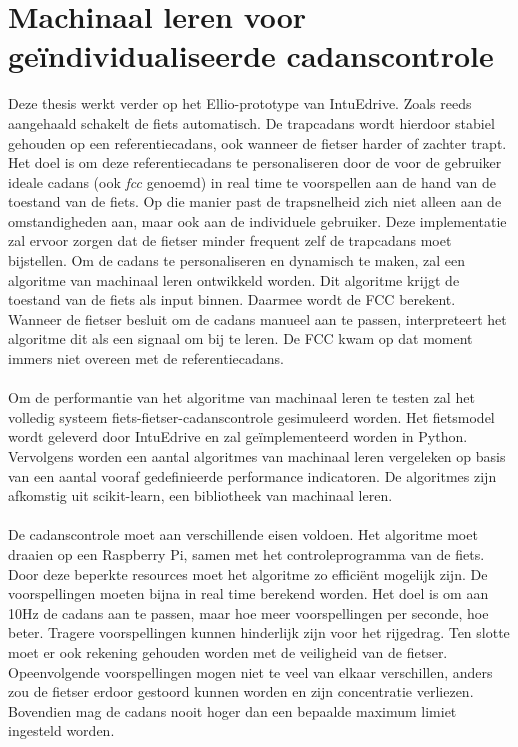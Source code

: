 \section{Machinaal leren voor geïndividualiseerde cadanscontrole}
Deze thesis werkt verder op het Ellio-prototype van IntuEdrive. Zoals reeds aangehaald schakelt de fiets automatisch. De trapcadans wordt hierdoor stabiel gehouden op een referentiecadans, ook wanneer de fietser harder of zachter trapt. Het doel is om deze referentiecadans te personaliseren door de voor de gebruiker ideale cadans (ook \textit{\gls{fcc}} genoemd) in real time te voorspellen aan de hand van de toestand van de fiets. Op die manier past de trapsnelheid zich niet alleen  aan de omstandigheden aan, maar ook aan de individuele gebruiker. Deze implementatie zal ervoor zorgen dat de fietser minder frequent zelf de trapcadans moet bijstellen. Om de cadans te personaliseren en dynamisch te maken, zal een algoritme van machinaal leren ontwikkeld worden. Dit algoritme krijgt de toestand van de fiets als input binnen. Daarmee wordt de FCC berekent. Wanneer de fietser besluit om de cadans manueel aan te passen, interpreteert het algoritme dit als een signaal om bij te leren. De FCC kwam op dat moment immers niet overeen met de referentiecadans.
\\\\
Om de performantie van het algoritme van machinaal leren te testen zal het volledig systeem fiets-fietser-cadanscontrole gesimuleerd worden. Het fietsmodel wordt geleverd door IntuEdrive en zal geïmplementeerd worden in Python. Vervolgens worden een aantal algoritmes van machinaal leren vergeleken op basis van een aantal vooraf gedefinieerde performance indicatoren. De algoritmes zijn afkomstig uit scikit-learn, een bibliotheek van machinaal leren.
\\\\
De cadanscontrole moet aan verschillende eisen voldoen. Het algoritme moet draaien op een Raspberry Pi, samen met het controleprogramma van de fiets. Door deze beperkte resources moet het algoritme zo efficiënt mogelijk zijn. De voorspellingen moeten bijna in real time berekend worden. Het doel is om aan 10Hz de cadans aan te passen, maar hoe meer voorspellingen per seconde, hoe beter. Tragere voorspellingen kunnen hinderlijk zijn voor het rijgedrag. Ten slotte moet er ook rekening gehouden worden met de veiligheid van de fietser. Opeenvolgende voorspellingen mogen niet te veel van elkaar verschillen, anders zou de fietser erdoor gestoord kunnen worden en zijn concentratie verliezen. Bovendien mag de cadans nooit hoger dan een bepaalde maximum limiet ingesteld worden.
